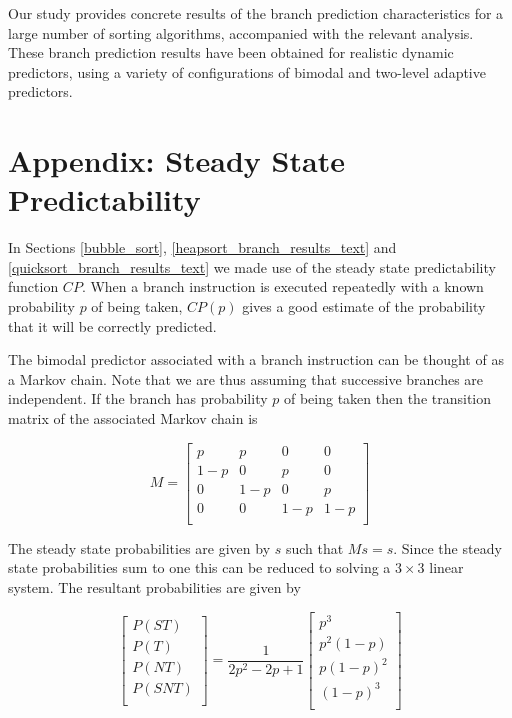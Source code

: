 \documentclass[acmtocl]{acmtrans2m}
\begin{document}
Our study provides concrete results of the branch prediction characteristics for
a large number of sorting algorithms, accompanied with the relevant analysis.
These branch prediction results have been obtained for realistic dynamic
predictors, using a variety of configurations of bimodal and two-level adaptive
predictors. 

\appendix

\section{Appendix: Steady State Predictability}
\label{appendix_SSP}

In Sections \ref{bubble_sort}, \ref{heapsort_branch_results_text} and
\ref{quicksort_branch_results_text} we made use of the steady state
predictability function $CP$. When a branch instruction is executed repeatedly
with a known probability $p$ of being taken, $CP(p)$ gives a good estimate of
the probability that it will be correctly predicted.

The bimodal predictor associated with a branch instruction can be thought of as
a Markov chain. Note that we are thus assuming that successive branches are
independent. If the branch has probability $p$ of being taken then the
transition matrix of the associated Markov chain is

\[
M = 
\left[
\begin{array}{llll}
p   & p   & 0   & 0 \\
1-p & 0   & p   & 0 \\
0   & 1-p & 0   & p \\
0   & 0   & 1-p & 1-p \\
\end{array}
\right]
\] 

\noindent
The steady state probabilities are given by $s$ such that $Ms = s$.
Since the steady state probabilities sum to one this can be reduced to solving
a $3 \times 3$ linear system. The resultant probabilities are given by

\[
\left[ 
\begin{array}{c}
P(ST) \\
P(T) \\
P(NT) \\
P(SNT) \\
\end{array}
\right]
=
\frac{1}{2p^2 - 2p + 1}
\left[
\begin{array}{c}
p^3 \\
p^2(1 - p) \\
p(1 - p)^2 \\
(1 - p)^3 \\
\end{array}
\right]
\]
\end{document}
